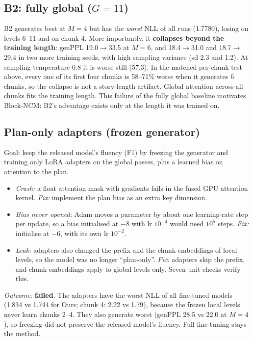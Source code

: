 \subsection{B2: fully global ($G{=}11$)}
B2 generates best at $M{=}4$ but has the \emph{worst} NLL of all runs (1.7780), losing on levels 6--11 and on
chunk 4. More importantly, it \textbf{collapses beyond the training length}: genPPL 19.0$\to$33.5 at $M{=}6$, and
18.4$\to$31.0 and 18.7$\to$29.4 in two more training seeds, with high sampling variance (sd 2.3 and 1.2). At
sampling temperature 0.8 it is worse still (57.3). In the matched per-chunk test above, every one of its first
four chunks is 58--71\% worse when it generates 6 chunks, so the collapse is not a story-length artifact. Global
attention across all chunks fits the training length. This failure of the fully global baseline motivates
Block-NCM: B2's advantage exists only at the length it was trained on.

\subsection{Plan-only adapters (frozen generator)}
Goal: keep the released model's fluency (F1) by freezing the generator and training only LoRA adapters on the
global passes, plus a learned bias on attention to the plan.
\begin{itemize}[nosep]
  \item \emph{Crash:} a float attention mask with gradients fails in the fused GPU attention kernel.
        \emph{Fix:} implement the plan bias as an extra key dimension.
  \item \emph{Bias never opened:} Adam moves a parameter by about one learning-rate step per update, so a bias
        initialised at $-8$ with lr $10^{-4}$ would need $10^5$ steps. \emph{Fix:} initialise at $-6$, with its
        own lr $10^{-2}$.
  \item \emph{Leak:} adapters also changed the prefix and the chunk embeddings of local levels, so the model was no
        longer ``plan-only''. \emph{Fix:} adapters skip the prefix, and chunk embeddings apply to global levels
        only. Seven unit checks verify this.
\end{itemize}
\emph{Outcome:} \textbf{failed}. The adapters have the worst NLL of all fine-tuned models (1.834 vs 1.744 for Ours;
chunk 4: 2.22 vs 1.79), because the frozen local levels never learn chunks 2--4. They also generate worst
(genPPL 28.5 vs 22.0 at $M{=}4$), so freezing did not preserve the released model's fluency. Full fine-tuning stays
the method.

